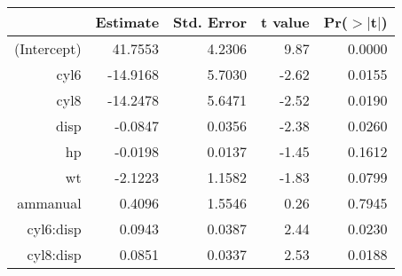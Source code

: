 \begin{tabular}{rrrrr}
  \hline
 & Estimate & Std. Error & t value & Pr($>$$|$t$|$) \\ 
  \hline
(Intercept) & 41.7553 & 4.2306 & 9.87 & 0.0000 \\ 
  cyl6 & -14.9168 & 5.7030 & -2.62 & 0.0155 \\ 
  cyl8 & -14.2478 & 5.6471 & -2.52 & 0.0190 \\ 
  disp & -0.0847 & 0.0356 & -2.38 & 0.0260 \\ 
  hp & -0.0198 & 0.0137 & -1.45 & 0.1612 \\ 
  wt & -2.1223 & 1.1582 & -1.83 & 0.0799 \\ 
  ammanual & 0.4096 & 1.5546 & 0.26 & 0.7945 \\ 
  cyl6:disp & 0.0943 & 0.0387 & 2.44 & 0.0230 \\ 
  cyl8:disp & 0.0851 & 0.0337 & 2.53 & 0.0188 \\ 
   \hline
\end{tabular}
